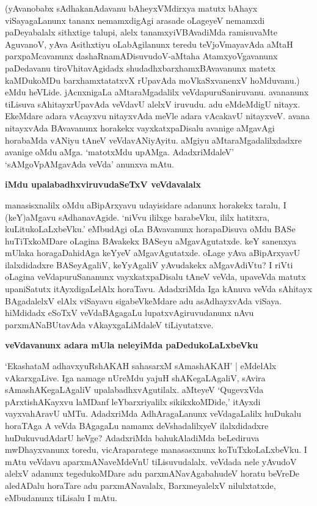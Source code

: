 (yAvanobabx sAdhakanAdavanu bAheyxVMdirxya matutx bAhayx viSayagaLanunx tananx nemamxdigAgi arasade oLageyeV nemamxdi paDeyabalalx sithxtige talupi, alelx tanamxyiVBAvadiMda ramisuvaMte AguvanoV, yAva Asithxtiyu oLabAgilanunx teredu teVjoVmayavAda aMtaH parxpaMcavanunx dashaRnamADisuvudoV-aMtaha AtamxyoVgavanunx paDedavanu tiroVhitavAgidadx shudadhxbarxhamxBAvavanunx matetx kaMDukoMDu barxhamxtatatxvX rUpavAda moVkaSxvanenxV hoMduvanu.) eMdu heVLide. jAcnxnigaLa aMtaraMgadalilx veVdapuruSaniruvanu. avananunx tiLisuva sAhitayxrUpavAda veVdavU alelxV iruvudu. adu eMdeMdigU nitayx. EkeMdare adara vAcayxvu nitayxvAda meVle adara vAcakavU nitayxveV. avana nitayxvAda BAvavanunx horakekx vayxkatxpaDisalu avanige aMgavAgi horabaMda vANiyu tAneV veVdavANiyAyitu. aMgiyu aMtaraMgadalilxdadxre avanige oMdu aMga. `matotxMdu upAMga. AdadxriMdaleV' `sAMgoVpAMgavAda veVda' anunxva mAtu.

\noindent
{\bf\large{iMdu upalabadhxviruvudaSeTxV veVdavalalx}}\label{page134}

manasisxnalilx oMdu aBipArxyavu udayisidare adanunx horakekx taralu, I (keY)aMgavu sAdhanavAgide. `niVvu ililxge barabeVku, ililx hatitxra, kuLitukoLaLxbeVku.' eMbudAgi oLa BAvavanunx horapaDisuva oMdu BASe huTiTxkoMDare oLagina BAvakekx BASeyu aMgavAgutatxde. keY sanenxya mUlaka horagaDahidAga keYyeV aMgavAgutatxde. oLage yAva aBipArxyavU ilalxdidadxre BASeyAgaliV, keYyAgaliV yAvudakekx aMgavAdiVtu? I riVti oLagina veVdapuruSananunx vayxkatxpaDisalu tAneV veVda, upaveVda matutx upaniSatutx itAyxdigaLelAlx horaTavu. AdadxriMda Iga kAnuva veVda sAhitayx BAgadalelxV elAlx viSayavu sigabeVkeMdare adu asAdhayxvAda viSaya. hiMdidadx eSoTxV veVdaBAgagaLu lupatxvAgiruvudanunx nAvu parxmANaBUtavAda vAkayxgaLiMdaleV tiLiyutatxve.

\noindent
{\bf\large{veVdavanunx adara mUla neleyiMda paDedukoLaLxbeVku}}\label{page135}

`EkashataM adhavxyuRshAKAH sahasarxM sAmashAKAH' |\label{135} eMdelAlx vAkarxgaLive. Iga namage nUreMdu yajuH shAKegaLAgaliV, sAvira sAmashAKegaLAgaliV upalabadhxvAgutilalx. aMteyeV `QugevxVda pArxtishAKayxvu laMDanf leYbarxriyalilx sikikxkoMDide,' itAyxdi vayxvahAravU uMTu. AdadxriMda AdhAragaLanunx veVdagaLalilx huDukalu horaTAga A veVda BAgagaLu namamx deVshadalilxyeV ilalxdidadxre huDukuvudAdarU heVge? AdadxriMda bahukAladiMda beLediruva mwDhayxvanunx toredu, vicAraparatege manasasxnunx koTuTxkoLaLxbeVku. I mAtu veVdavu aparxmANaveMdeVnU tiLisuvudalalx. veVdada nele yAvudoV alelxV adanunx tegedukoMDare adu parxmANavAgabahudeV horatu beVreDe aledADalu horaTare adu parxmANavalalx, BarxmeyalelxV nilulxtatxde, eMbudanunx tiLisalu I mAtu.

